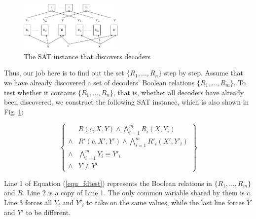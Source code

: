 \documentclass[journal]{IEEEtran}
\begin{document}
\begin{figure}[t]
\centering
\includegraphics[width=0.45\textwidth]{fdtest}
\caption{The SAT instance that discovers decoders}
\label{fig_fdtest}
\end{figure}

Thus,
our job here is to find out the set $\{R_1,\dots,R_n\}$ step by step.
Assume that we have already discovered a set of decoders' Boolean relations $\{R_1,\dots,R_{m}\}$.
To test whether it contains $\{R_1,\dots,R_n\}$,
that is,
whether all decoders have already been discovered,
we construct the following SAT instance,
which is also shown in Fig. \ref{fig_fdtest}:



\begin{equation}\label{equ_fdtest}
\left\{
\begin{array}{cc}
      & R(c,X,Y)\wedge \bigwedge_{i=1}^{m}R_i(X,Y_i)  \\
\wedge& R'(c,X',Y') \wedge \bigwedge_{i=1}^{m}R'_i(X',Y'_i)  \\
\wedge&\bigwedge_{i=1}^{m}Y_i\equiv Y'_i\\
\wedge& Y\ne Y'
\end{array}
\right\}
\end{equation}

Line 1 of Equation (\ref{equ_fdtest}) represents the Boolean relations in $\{R_1,\dots,R_{m}\}$ and $R$.
Line 2 is a copy of Line 1.
The only common variable shared by them is $c$.
Line 3 forces all $Y_i$ and $Y'_i$ to take on the same values,
while the last line forces $Y$ and $Y'$ to be different.
\end{document}
